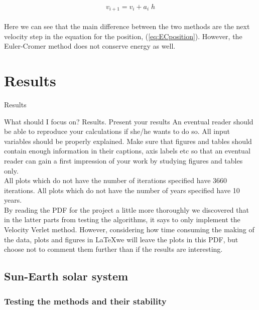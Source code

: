 \documentclass{article}
\begin{document}
    \begin{equation}    \label{eq:ECvelocity}
        v_{i+1} = v_i + a_i \; h
    \end{equation} \\

    Here we can see that the main difference between the two methods are the next velocity step in the equation for the position, (\ref{eq:ECposition}). However, the Euler-Cromer method does not conserve energy as well.



\vspace{1cm}

\section{Results} \label{sec:Results}

    Results

    What should I focus on? Results.
    Present your results
    An eventual reader should be able to reproduce your calculations if she/he wants to do so. All input variables should be properly explained.
    Make sure that figures and tables should contain enough information in their captions, axis labels etc so that an eventual reader can gain a first impression of your work by studying  figures and tables only. \\


    All plots which do not have the number of iterations specified have 3660 iterations. All plots which do not have the number of years specified have 10 years. \\

    By reading the PDF for the project a little more thoroughly we discovered that in the latter parts from testing the algorithms, it says to only implement the Velocity Verlet method. However, considering how time consuming the making of the data, plots and figures in \LaTeX we will leave the plots in this PDF, but choose not to comment them further than if the results are interesting. \\


\subsection{Sun-Earth solar system}

\subsubsection{Testing the methods and their stability}
\end{document}
